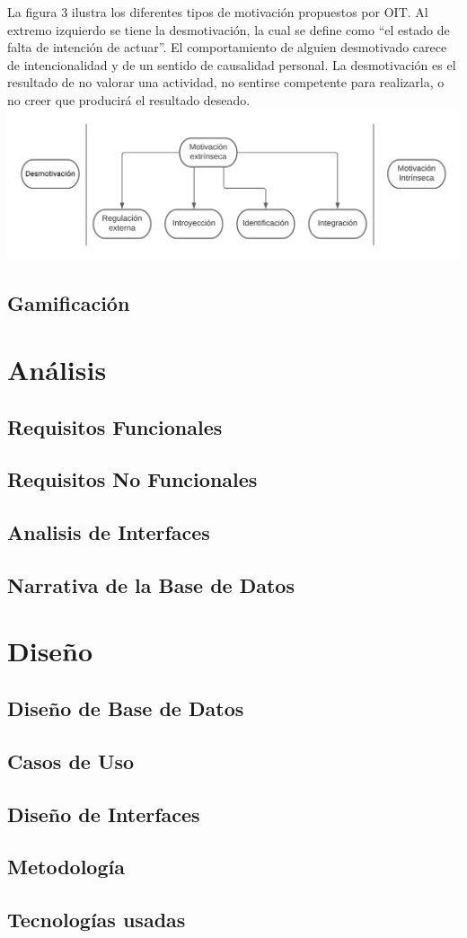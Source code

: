 \documentclass{article}
\begin{document}
La figura 3 ilustra los diferentes tipos de motivación propuestos por OIT. Al extremo izquierdo se tiene la desmotivación, la cual se define como “el estado de falta de intención de actuar”. El comportamiento de alguien desmotivado carece de intencionalidad y de un sentido de causalidad personal. La desmotivación es el resultado de no valorar una actividad, no sentirse competente para realizarla, o no creer que producirá el resultado deseado.\\
\includegraphics[scale=1]{imgs/MotivacionDiagrama.png}

\subsection{Gamificación}
\section{Análisis}
\subsection{Requisitos Funcionales}
\subsection{Requisitos No Funcionales}
\subsection{Analisis de Interfaces}
\subsection{Narrativa de la Base de Datos}
\section{Diseño}
\subsection{Diseño de Base de Datos}
\subsection{Casos de Uso}
\subsection{Diseño de Interfaces}
\subsection{Metodología}
\subsection{Tecnologías usadas}
\end{document}
